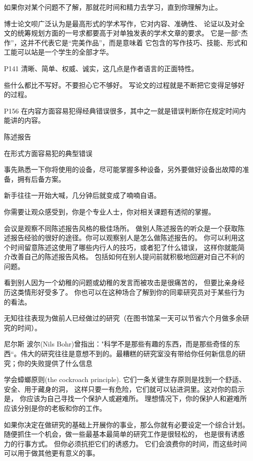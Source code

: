 如果你对某个问题不了解，那就花时间和精力去学习，直到你理解为止。

博士论文呗广泛认为是最高形式的学术写作，它对内容、准确性、
论证以及对全文的统筹规划方面的一号求都要高于对单独发表的学术文章的要求。
它是一部“杰作”，这并不代表它是“完美作品”，而是意味着
它包含的写作技巧、技能、形式和工能可以站是一个学生的全部才华。


P141
清晰、简单、权威、诚实，这几点是作者语言的正面特性。


些什么都比不写好。不要担心它不够好。
写论文的过程就是不断把它变得足够好的过程。


P156 
在内容方面容易犯得经典错误很多，其中之一就是错误判断你在规定时间内能讲的内容。


陈述报告

在形式方面容易犯的典型错误

事先熟悉一下你将使用的设备，尽可能掌握多种设备，另外要做好设备出故障的准备，拥有后备方案。

新手往往一开始大喊，几分钟后就变成了喃喃自语。

你需要让观众感受到，你是个专业人士，你对相关课题有透彻的掌握。

会议是观察不同陈述报告风格的极佳场所。
做别人陈述报告的听众是一个获取陈述报告经验的很好的途径。你可以观察别人是怎么做陈述报告的。
你可以利用这个时间留意陈述这使用了哪些内行人的技巧，或者犯了什么错误，
这样你就能简介改善自己的陈述报告风格。
包括如何在别人提问前就积极地回避对自己不利的问题。

看到别人因为一个幼稚的问题或幼稚的发言而被攻击是很痛苦的，
但要比亲身经历这类情形好受多了。
你也可以在这种场合了解到你的同辈研究员对于某些行为的看法。

无知往往表现为做前人已经做过的研究（在图书馆呆一天可以节省六个月做多余研究的时间）。

尼尔斯 波尔(Nils Bohr)曾指出："科学不是那些有趣的东西，而是那些奇怪的东西“。伟大的研究往往是意想不到的。最糟糕的研究室没有带给你任何新信息的研究；你的失败提供了什么信息

学会蟑螂原则(the  cockroach principle). 它们一条关键生存原则是找到一个舒适、安全、用于藏身的洞，
这样只要一有危险，它们就可以钻进洞里。这对你的启示是， 
你应该为自己寻找一个保护人或避难所。
理想情况下，你的保护人和避难所应该分别是你的老板和你的工作。

如果你决定在做研究的基础上开展你的事业，那么你就有必要设定一个综合计划。
随便抓住一个机会，做一些最基本最简单的研究工作是很轻松的，
也是很有诱惑力的行事方式。
但你必须抗拒它们的诱惑力。
它们会浪费你的时间，而这些时间可以用于做其他更有意义的事。

